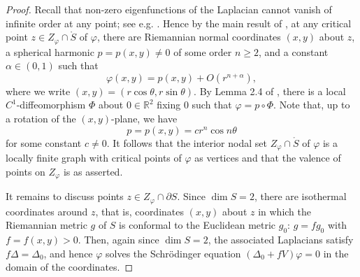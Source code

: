 \begin{proof}
Recall that non-zero eigenfunctions of the Laplacian
cannot vanish of infinite order at any point; see e.g. \cite{Ar}.
Hence by the main result of \cite{Be}, at any critical point $z\in Z_{\varphi}\cap\mathring S$ of ${\varphi}$,
there are Riemannian normal coordinates $(x,y)$ about $z$,
a spherical harmonic $p=p(x,y)\ne0$ of some order $n\ge2$,
and a constant $\alpha\in(0,1)$ such that
\begin{equation*}
   {\varphi}(x,y) = p(x,y) + O(r^{n+\alpha}),
\end{equation*}
where we write $(x,y)=(r\cos\theta,r\sin\theta)$.
By Lemma 2.4 of \cite{Che}, there is a local $C^1$-diffeomorphism $\Phi$
about $0\in{\mathbb R}^2$ fixing $0$ such that ${\varphi}=p\circ \Phi$.
Note that, up to a rotation of the $(x,y)$-plane, we have
\begin{equation*}
  p=p(x,y)=cr^n\cos n\theta
\end{equation*}
for some constant $c\ne0$.
It follows that the interior nodal set $Z_{\varphi}\cap\mathring S$ of ${\varphi}$
is a locally finite graph with critical points of ${\varphi}$ as vertices
and that the valence of points on $Z_{\varphi}$ is as asserted.

It remains to discuss points $z\in Z_{\varphi}\cap\partial S$.
Since $\dim S=2$, there are isothermal coordinates around $z$, that is,
coordinates $(x,y)$ about $z$
in which the Riemannian metric $g$ of $S$ is conformal to the Euclidean metric $g_0$:
$g=fg_0$ with $f=f(x,y)>0$.
Then, again since $\dim S=2$, the associated Laplacians satisfy $f\Delta=\Delta_0$,
and hence ${\varphi}$ solves  the Schr\"odinger equation $(\Delta_0+fV){\varphi}=0$
in the domain of the coordinates.


\end{proof}
